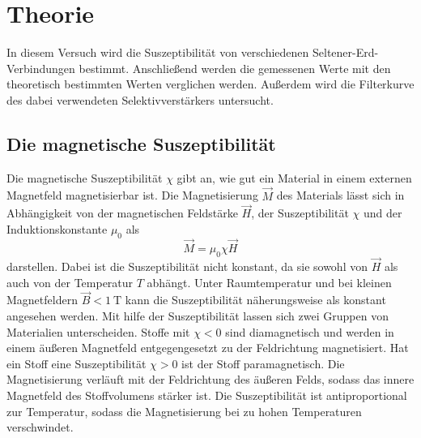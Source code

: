 \section{Theorie}
\label{sec:Theorie}
In diesem Versuch wird die Suszeptibilität von verschiedenen Seltener-Erd-Verbindungen bestimmt. 
Anschließend werden die gemessenen Werte mit den theoretisch bestimmten Werten verglichen werden.
Außerdem wird die Filterkurve des dabei verwendeten Selektivverstärkers untersucht. 
\\
\subsection{Die magnetische Suszeptibilität}
Die magnetische Suszeptibilität $\chi$ gibt an, wie gut ein Material in einem externen Magnetfeld magnetisierbar ist.
Die Magnetisierung $\vec{M}$ des Materials lässt sich in Abhängigkeit von der magnetischen Feldstärke $\vec{H}$, der Suszeptibilität $\chi$ und der 
Induktionskonstante $\mu_0$ als
\begin{equation}
    \vec{M}=\mu_0 \chi \vec{H}
\end{equation}
darstellen. Dabei ist die Suszeptibilität nicht konstant, da sie sowohl von $\vec{H}$ als auch von der Temperatur $T$ abhängt. Unter Raumtemperatur und bei kleinen Magnetfeldern $\vec{B}<\SI{1}{\tesla}$
kann die Suszeptibilität näherungsweise als konstant angesehen werden. Mit hilfe der Suszeptibilität lassen sich zwei Gruppen von Materialien unterscheiden.
Stoffe mit $\chi<0$ sind diamagnetisch und werden in einem äußeren Magnetfeld entgegengesetzt zu der Feldrichtung magnetisiert. Hat ein Stoff eine Suszeptibilität $\chi>0$ ist der Stoff
paramagnetisch. Die Magnetisierung verläuft mit der Feldrichtung des äußeren Felds, sodass das innere Magnetfeld des Stoffvolumens stärker ist. Die Suszeptibilität
ist antiproportional zur Temperatur, sodass die Magnetisierung bei zu hohen Temperaturen verschwindet.
\\

